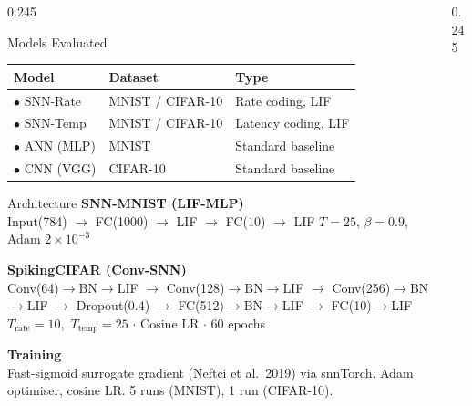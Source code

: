 \documentclass[final]{beamer}
\begin{document}
\begin{frame}[t]
\begin{columns}[t,totalwidth=\paperwidth]
\begin{column}{0.245\paperwidth}
\begin{block}{Models Evaluated}
  {\small\begin{tabular}{@{}lll@{}}
    \toprule
    \textbf{Model} & \textbf{Dataset} & \textbf{Type} \\
    \midrule
    {\color{snnrate}$\bullet$} SNN-Rate   & MNIST / CIFAR-10 & Rate coding, LIF \\
    {\color{snntemporal}$\bullet$} SNN-Temp & MNIST / CIFAR-10 & Latency coding, LIF \\
    {\color{anngreen}$\bullet$} ANN (MLP)   & MNIST            & Standard baseline \\
    {\color{cnnpurple}$\bullet$} CNN (VGG)  & CIFAR-10         & Standard baseline \\
    \bottomrule
  \end{tabular}}
\end{block}

\begin{block}{Architecture}
  \textbf{\color{accentblue}SNN-MNIST (LIF-MLP)}\\[0.15em]
  {\small Input(784) $\to$ FC(1000) $\to$ LIF $\to$ FC(10) $\to$ LIF\quad
  $T\!=\!25$, $\beta\!=\!0.9$, Adam $2\!\times\!10^{-3}$}

  \vspace{0.4em}
  \textbf{\color{accentblue}SpikingCIFAR (Conv-SNN)}\\[0.15em]
  {\small Conv(64)$\to$BN$\to$LIF $\to$ Conv(128)$\to$BN$\to$LIF $\to$
  Conv(256)$\to$BN$\to$LIF $\to$ Dropout(0.4) $\to$ FC(512)$\to$BN$\to$LIF
  $\to$ FC(10)$\to$LIF\\[0.1em]
  $T_\text{rate}\!=\!10$,\ $T_\text{temp}\!=\!25$ $\cdot$ Cosine LR $\cdot$ 60 epochs}

  \vspace{0.4em}
  \textbf{\color{accentblue}Training}\\[0.15em]
  {\small Fast-sigmoid surrogate gradient (Neftci et al.\ 2019) via snnTorch.
  Adam optimiser, cosine LR. 5 runs (MNIST), 1 run (CIFAR-10).}
\end{block}

\end{column}

\begin{column}{0.245\paperwidth}


\end{column}
\end{columns}
\end{frame}
\end{document}
